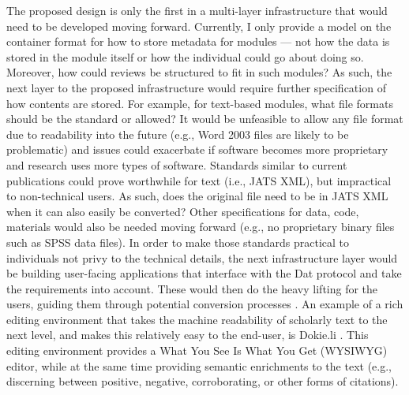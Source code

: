 \documentclass[publications,article,submit,moreauthors,pdftex,10pt,a4paper]{Definitions/mdpi}
\providecommand{\DIFaddtex}[1]{{\protect\color{blue}\uwave{#1}}} %
\providecommand{\DIFaddbegin}{} %
\providecommand{\DIFaddend}{} %
\providecommand{\DIFadd}[1]{\texorpdfstring{\DIFaddtex{#1}}{#1}} %
\newcommand{\DIFaddincludegraphics}[2][]{{\color{blue}\fbox{\DIFOincludegraphics[#1]{#2}}}} %
\DeclareRobustCommand{\DIFaddbegin}{\DIFOaddbegin \let\includegraphics\DIFaddincludegraphics} %
\DeclareRobustCommand{\DIFaddend}{\DIFOaddend \let\includegraphics\DIFOincludegraphics} %
\begin{document}
The proposed design is only the first in a multi-layer infrastructure
that would need to be developed moving forward. Currently, I only
provide a model on the container format for how to store metadata for
modules --- not how the data is stored in the module itself or how the
individual could go about doing so. Moreover, how could reviews be
structured to fit in such modules?  As such, the next layer to the
proposed infrastructure would require further specification of how
contents are stored. For example, for text-based modules, what file
formats should be the standard or allowed? It would be unfeasible to
allow any file format due to readability into the future (e.g., Word
2003 files are likely to be problematic) and issues could exacerbate
if software becomes more proprietary and research uses more types of
software. Standards similar to current publications could prove
worthwhile for text (i.e., JATS XML), but impractical to non-technical
users. As such, does the original file need to be in JATS XML when it
can also easily be converted? \citep[e.g., Markdown to JATS
  XML;][]{jatdown} Other specifications for data, code, materials
would also be needed moving forward (e.g., no proprietary binary files
such as SPSS data files). In order to make those standards practical
to individuals not privy to the technical details, the next
infrastructure layer would be building user-facing applications that
interface with the Dat protocol and take the requirements into
account. These would then do the heavy lifting for the users, guiding
them through potential conversion processes \DIFaddbegin \DIFadd{and reducing friction as
much as possible}\DIFaddend . An example of a rich editing environment that takes
the machine readability of scholarly text to the next level, and makes
this relatively easy to the end-user, is Dokie.li \citep[which writes
  to HTML;][]{dokieli}. This editing environment provides a What You
See Is What You Get (WYSIWYG) editor, while at the same time providing
semantic enrichments to the text (e.g., discerning between positive,
negative, corroborating, or other forms of citations).
\end{document}
